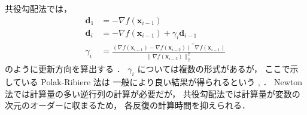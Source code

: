 共役勾配法では，
\begin{align}
    \bm{d}_1 & = -\nabla f(\bm{x}_{i-1})                         \\
    \bm{d}_i & = -\nabla f(\bm{x}_{i-1}) + \gamma_i \bm{d}_{i-1} \\
    \gamma_i & =
    \frac{(\nabla f(\bm{x}_{i-1}) - \nabla f(\bm{x}_{i-2}))^\top \nabla f(\bm{x}_{i-1})}
    {\|\nabla f(\bm{x}_{i-2})\|_2^2}
\end{align}
のように更新方向を算出する
\cite[Section 8.6]{Luenberger2003}．
$\gamma_i$ については複数の形式があるが，
ここで示している  Polak-Ribiere 法は
一般により良い結果が得られるという
\cite[Section 8.6]{Luenberger2003}, \cite[Section 10.8]{Press2007}．
Newton 法では計算量の多い逆行列の計算が必要だが，
共役勾配法では計算量が変数の次元のオーダーに収まるため，
各反復の計算時間を抑えられる．
